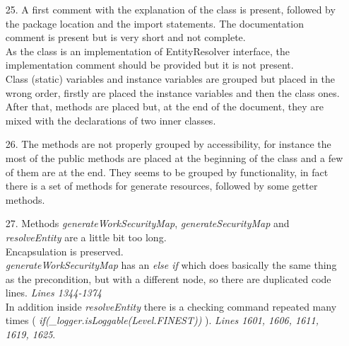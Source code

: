 \begin{itemize}
\item [25.]  A first comment with the explanation of the class is present, followed by the package location and the import statements. The documentation comment is present but is very short and not complete.\\
As the class is an implementation of EntityResolver interface, the implementation comment should be provided but it is not present.\\
Class (static) variables and instance variables are grouped but placed in the wrong order, firstly are placed the instance variables and then the class ones.\\
After that, methods are placed but, at the end of the document, they are mixed with the declarations of two inner classes.
\item [26.] The methods are not properly grouped by accessibility, for instance the most of the public methods are placed at the beginning of the class and a few of them are at the end.
They seems to be grouped by functionality, in fact there is a set of methods for generate resources, followed by some getter methods.
\item [27.] Methods \textit{generateWorkSecurityMap}, \textit{generateSecurityMap} and \textit{resolveEntity} are a little bit too long.\\
Encapsulation is preserved.\\
\textit{generateWorkSecurityMap} has an \textit{else if} which does basically the same thing as the precondition, but with a different node, so there are duplicated code lines. \textit{Lines 1344-1374}\\
In addition inside \textit{resolveEntity} there is a checking command repeated many times ( \textit{if(\_logger.isLoggable(Level.FINEST))} ). \textit{Lines 1601, 1606, 1611, 1619, 1625}.
\end{itemize}
